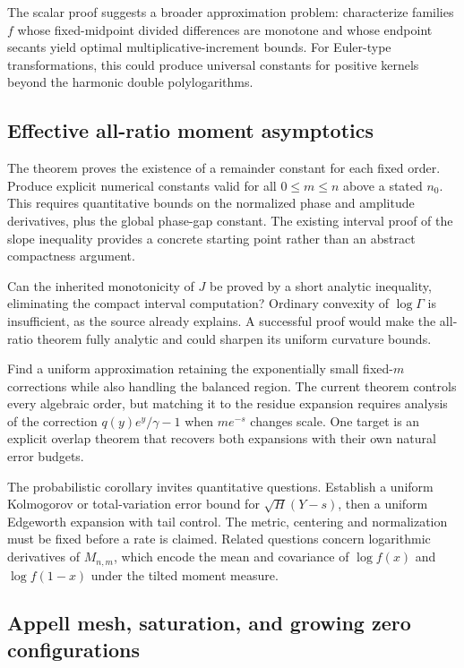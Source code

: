 \documentclass[11pt,letterpaper]{article}
\theoremstyle{definition}
\theoremstyle{remark}
\begin{document}
The scalar proof suggests a broader approximation problem: characterize
families $f$ whose fixed-midpoint divided differences are monotone and
whose endpoint secants yield optimal multiplicative-increment bounds.
For Euler-type transformations, this could produce universal constants
for positive kernels beyond the harmonic double polylogarithms.

\subsection{Effective all-ratio moment asymptotics}

The theorem proves the existence of a remainder constant for each fixed
order. Produce explicit numerical constants valid for all $0\le m\le n$
above a stated $n_0$. This requires quantitative bounds on the normalized
phase and amplitude derivatives, plus the global phase-gap constant.
The existing interval proof of the slope inequality provides a concrete
starting point rather than an abstract compactness argument.

Can the inherited monotonicity of $J$ be proved by a short analytic
inequality, eliminating the compact interval computation? Ordinary
convexity of $\log\Gamma$ is insufficient, as the source already explains.
A successful proof would make the all-ratio theorem fully analytic and
could sharpen its uniform curvature bounds.

Find a uniform approximation retaining the exponentially small
fixed-$m$ corrections while also handling the balanced region. The
current theorem controls every algebraic order, but matching it to the
residue expansion requires analysis of the correction
$q(y)e^y/\gamma-1$ when $m e^{-s}$ changes scale. One target is an
explicit overlap theorem that recovers both expansions with their own
natural error budgets.

The probabilistic corollary invites quantitative questions. Establish a
uniform Kolmogorov or total-variation error bound for
$\sqrt H(Y-s)$, then a uniform Edgeworth expansion with tail control.
The metric, centering and normalization must be fixed before a rate is
claimed. Related questions concern logarithmic derivatives of $M_{n,m}$,
which encode the mean and covariance of $\log f(x)$ and $\log f(1-x)$
under the tilted moment measure.

\subsection{Appell mesh, saturation, and growing zero configurations}
\end{document}
